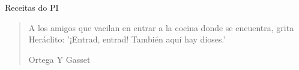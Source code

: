 Receitas do PI

\begin{quote}
  A los amigos que vacilan en entrar a la cocina donde se encuentra, grita Heráclito: '¡Entrad, entrad! También aquí hay dioses.'

Ortega Y Gasset
\end{quote}